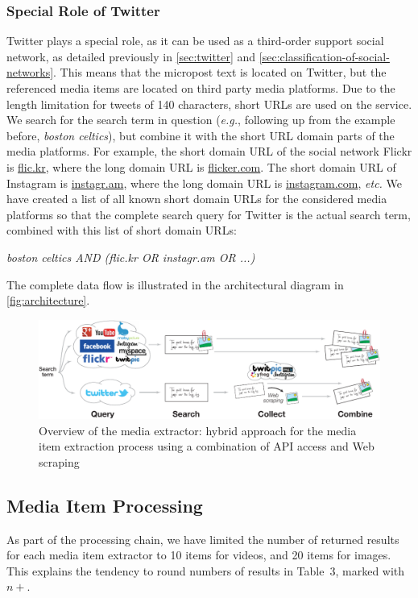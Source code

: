 \subsubsection{Special Role of Twitter}

Twitter plays a special role, as it can be used as
a third-order support social network,
as detailed previously in
\autoref{sec:twitter}
and \autoref{sec:classification-of-social-networks}.
This means that the micropost text is located on Twitter,
but the referenced media items are located
on third party media platforms.
Due to the length limitation for tweets of 140 characters,
short URLs are used on the service.
We search for the search term in question (\emph{e.g.},
following up from the example before, \emph{boston celtics}),
but combine it with the short URL domain parts of
the media platforms.
For example, the short domain URL of the social network Flickr
is \url{flic.kr}, where the long domain URL is \url{flicker.com}.
The short domain URL of Instagram is \url{instagr.am},
where the long domain URL is \url{instagram.com}, \emph{etc.}
We have created a list of all known short domain URLs for the 
considered media platforms so that the complete search query
for Twitter is the actual search term,
combined with this list of short domain URLs:

\emph{boston celtics AND (flic.kr OR instagr.am OR ...)}

\noindent The complete data flow is illustrated in the
architectural diagram in \autoref{fig:architecture}.

\begin{figure}
  \centering
  \includegraphics[width=1.0\linewidth]{architecture.pdf}
  \caption{Overview of the media extractor:
    hybrid approach for the media item extraction process using
    a combination of API access and Web scraping}
  \label{fig:architecture}
\end{figure}

\subsection{Media Item Processing}
As part of the processing chain, we have limited the number of returned results for each media item extractor to 10 items for videos, and 20 items for images. This explains the tendency to round numbers of results in Table~3, marked with $n+$.

